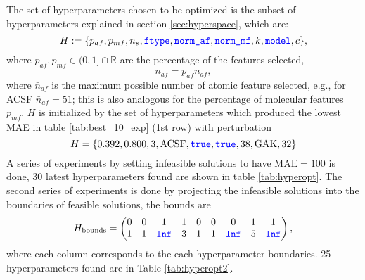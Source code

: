 \documentclass[12pt]{article}
\begin{document}
The set of hyperparameters chosen to be optimized is the subset of hyperparameters explained in section \ref{sec:hyperspace}, which are:
\begin{equation*}
	H := \{p_{af}, p_{mf}, n_s, \codeword{ftype}, \codeword{norm_af}, \codeword{norm_mf}, k, \codeword{model}, c\},
\end{equation*}
where $p_{af}, p_{mf} \in (0,1] \cap \mathbb{R}$ are the percentage of the features selected, 
\begin{equation*}
	n_{af} = p_{af} \bar{n}_{af},
\end{equation*}
where $\bar{n}_{af}$ is the maximum possible number of atomic feature selected, e.g., for ACSF $\bar{n}_{af} = 51$; this is also analogous for the percentage of molecular features $p_{mf}$.
$H$ is initialized by the set of hyperparameters which produced the lowest MAE in table \ref{tab:best_10_exp} (1st row) with perturbation
\begin{equation*}
	H = \{0.392, 0.800, 3, \text{ACSF}, \codeword{true}, \codeword{true}, 38, \text{GAK}, 32\}
\end{equation*}
A series of experiments by setting infeasible solutions to have $\text{MAE} = 100$ is done, 30 latest hyperparameters found are shown in table \ref{tab:hyperopt}.
The second series of experiments is done by projecting the infeasible solutions into the boundaries of feasible solutions, the bounds are
\begin{equation}
	H_\text{bounds} =
	\begin{pmatrix}
		0 & 0 & 1  & 1  & 0  & 0 &  0  & 1 &  1 \\
		1 & 1 & \codeword{Inf} & 3  & 1  & 1 &  \codeword{Inf}& 5 &  \codeword{Inf}
	\end{pmatrix},
	\label{eq:Hbound}
\end{equation}
where each column corresponds to the each hyperparameter boundaries. 25 hyperparameters found are in Table \ref{tab:hyperopt2}.
\end{document}
